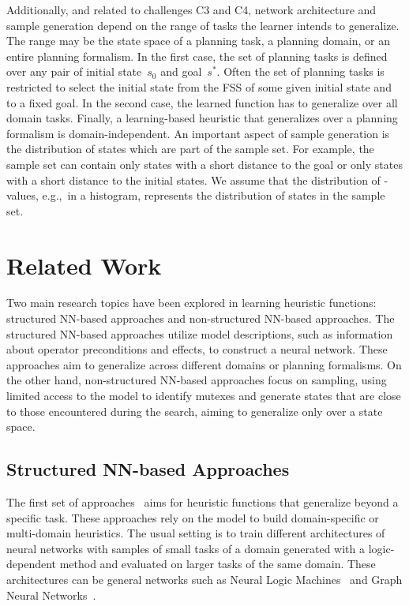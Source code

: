 Additionally, and related to challenges C3 and C4, network architecture and sample generation depend on the range of tasks the learner intends to generalize. The range may be the state space of a planning task, a planning domain, or an entire planning formalism. In the first case, the set of planning tasks is defined over any pair of initial state~$s_0$ and goal~$s^*$. Often the set of planning tasks is restricted to select the initial state from the FSS of some given initial state and to a fixed goal. In the second case, the learned function has to generalize over all domain tasks. Finally, a learning-based heuristic that generalizes over a planning formalism is domain-independent. An important aspect of sample generation is the distribution of states which are part of the sample set. For example, the sample set can contain only states with a short distance to the goal or only states with a short distance to the initial states. We assume that the distribution of \hstar-values, e.g.,~in a histogram, represents the distribution of states in the sample set.

\section{Related Work}
\label{sec:related-work}

Two main research topics have been explored in learning heuristic functions: structured NN-based approaches and non-structured NN-based approaches. The structured NN-based approaches utilize model descriptions, such as information about operator preconditions and effects, to construct a neural network. These approaches aim to generalize across different domains or planning formalisms. On the other hand, non-structured NN-based approaches focus on sampling, using limited access to the model to identify mutexes and generate states that are close to those encountered during the search, aiming to generalize only over a state space.

\subsection{Structured NN-based Approaches}
\label{sec:related-work-nn-based}

The first set of approaches~\cite{toyer2018action,toyer2020asnets,shen2020learning,stahlberg2022learning,gehring2022reinforcement} aims for heuristic functions that generalize beyond a specific task. These approaches rely on the model to build domain-specific or multi-domain heuristics. The usual setting is to train different architectures of neural networks with samples of small tasks of a domain generated with a logic-dependent method and evaluated on larger tasks of the same domain. These architectures can be general networks such as Neural Logic Machines~\cite{dong2018neural} and Graph Neural Networks~\cite{scarselli2008graph,gori2005new}.

